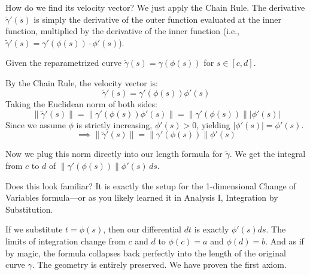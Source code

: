 \begin{spokenclean}[00:16:30 - 00:17:45]
How do we find its velocity vector? We just apply the Chain Rule. The derivative $\tilde{\gamma}'(s)$ is simply the derivative of the outer function evaluated at the inner function, multiplied by the derivative of the inner function (i.e., $\tilde{\gamma}'(s) = \gamma'(\phi(s)) \cdot \phi'(s)$). 
\end{spokenclean}

\begin{mathstroke}
Given the reparametrized curve $\tilde{\gamma}(s) = \gamma(\phi(s))$ for $s \in [c, d]$.

By the Chain Rule, the velocity vector is:
\[
\tilde{\gamma}'(s) = \gamma'(\phi(s)) \phi'(s)
\]
Taking the Euclidean norm of both sides:
\[
\|\tilde{\gamma}'(s)\| = \|\gamma'(\phi(s)) \phi'(s)\| = \|\gamma'(\phi(s))\| |\phi'(s)|
\]
Since we assume $\phi$ is strictly increasing, $\phi'(s) > 0$, yielding $|\phi'(s)| = \phi'(s)$.
\[
\implies \|\tilde{\gamma}'(s)\| = \|\gamma'(\phi(s))\| \phi'(s)
\]
\end{mathstroke}

\begin{spokenclean}[00:17:45 - 00:19:00]
Now we plug this norm directly into our length formula for $\tilde{\gamma}$. We get the integral from $c$ to $d$ of $\|\gamma'(\phi(s))\| \phi'(s) \, ds$. 

Does this look familiar? It is exactly the setup for the 1-dimensional Change of Variables formula—or as you likely learned it in Analysis I, Integration by Substitution. 
\end{spokenclean}

\begin{spokenclean}[00:19:00 - 00:20:00]
If we substitute $t = \phi(s)$, then our differential $dt$ is exactly $\phi'(s) ds$. The limits of integration change from $c$ and $d$ to $\phi(c)=a$ and $\phi(d)=b$. And as if by magic, the formula collapses back perfectly into the length of the original curve $\gamma$. The geometry is entirely preserved. We have proven the first axiom.
\end{spokenclean}

